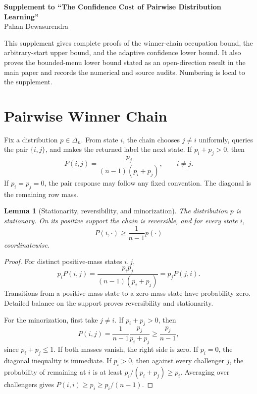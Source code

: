 \documentclass{article}
\newtheorem{lemma}[theorem]{Lemma}
\begin{document}
\runningauthor{}

\onecolumn
\begin{center}
 {\Large\bfseries Supplement to ``The Confidence Cost of Pairwise
 Distribution Learning''}\\[0.75em]
 Pahan Dewasurendra
\end{center}

This supplement gives complete proofs of the winner-chain occupation bound,
the arbitrary-start upper bound, and the adaptive confidence lower bound. It
also proves the bounded-menu lower bound stated as an open-direction result
in the main paper and records the numerical and source audits. Numbering is
local to the supplement.

\section{Pairwise Winner Chain}
\label{app:chain}

Fix a distribution $p\in\Delta_n$. From state $i$, the chain chooses
$j\ne i$ uniformly, queries the pair $\{i,j\}$, and makes the returned label
the next state. If $p_i+p_j>0$, then
\begin{equation}
 P(i,j)=\frac{p_j}{(n-1)(p_i+p_j)},\qquad i\ne j.
 \label{eq:app-kernel}
\end{equation}
If $p_i=p_j=0$, the pair response may follow any fixed convention. The
diagonal is the remaining row mass.

\begin{lemma}[Stationarity, reversibility, and minorization]
\label{lem:app-basic}
The distribution $p$ is stationary. On its positive support the chain is
reversible, and for every state $i$,
\begin{equation}
 P(i,\cdot)\ge\frac1{n-1}p(\cdot)
 \label{eq:app-minorization}
\end{equation}
coordinatewise.
\end{lemma}

\begin{proof}
For distinct positive-mass states $i,j$,
\[
 p_iP(i,j)=\frac{p_ip_j}{(n-1)(p_i+p_j)}=p_jP(j,i).
\]
Transitions from a positive-mass state to a zero-mass state have probability
zero. Detailed balance on the support proves reversibility and stationarity.

For the minorization, first take $j\ne i$. If $p_i+p_j>0$, then
\[
 P(i,j)=\frac1{n-1}\frac{p_j}{p_i+p_j}
 \ge\frac{p_j}{n-1},
\]
since $p_i+p_j\le1$. If both masses vanish, the right side is zero. If
$p_i=0$, the diagonal inequality is immediate. If $p_i>0$, then against
every challenger $j$, the probability of remaining at $i$ is at least
$p_i/(p_i+p_j)\ge p_i$. Averaging over challengers gives
$P(i,i)\ge p_i\ge p_i/(n-1)$.
\end{proof}
\end{document}
